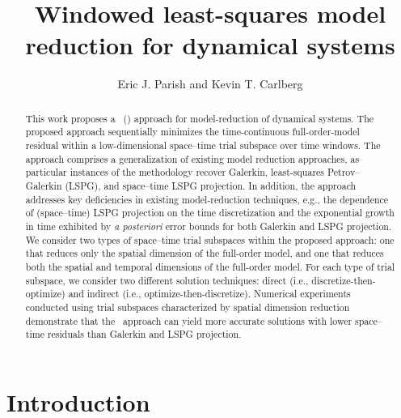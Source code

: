 \documentclass[3p,computermodern,10pt]{elsarticle}
\begin{document}
\begin{frontmatter}

\title{Windowed least-squares model reduction for dynamical systems}

\author[a]{Eric J. Parish and Kevin T. Carlberg}

\address[a]{Sandia National Laboratories,  Livermore, CA}
\begin{abstract}
This work proposes a \methodNameLower\ (\methodAcronym) approach for model-reduction
	of dynamical systems. The proposed approach sequentially minimizes the
	time-continuous full-order-model residual within a low-dimensional space--time trial
	subspace over time windows. The approach comprises a generalization 
of existing model reduction approaches, as particular instances of
  the methodology recover Galerkin,
	least-squares Petrov--Galerkin (LSPG), and space–time LSPG projection. In
	addition, the approach
	addresses key deficiencies in existing model-reduction
	techniques, e.g., the dependence of (space--time) LSPG projection on the
	time discretization and the exponential growth in time exhibited by \textit{a posteriori}
	error bounds for both Galerkin and LSPG projection.  We consider two types of
	space--time trial
	subspaces within the proposed approach: one that reduces only the spatial dimension of the full-order model, and one that reduces both the spatial and temporal dimensions of the full-order model. For each type of trial
	subspace, we consider two different solution techniques: direct (i.e.,
	discretize-then-optimize) and indirect (i.e., optimize-then-discretize).
	Numerical experiments conducted using trial subspaces characterized by spatial
	dimension reduction demonstrate that the \methodAcronym\
	approach can yield more accurate solutions with lower space--time residuals than
	Galerkin and LSPG projection. 

\end{abstract}
\end{frontmatter}


\section{Introduction}
\end{document}

